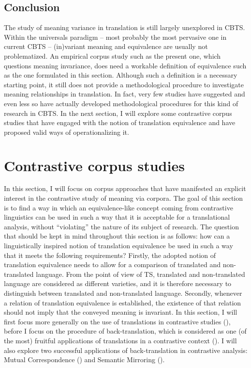 \subsection{Conclusion}
\label{sec:2.2.5}  
The study of meaning variance in translation is still largely unexplored in CBTS. Within the universals paradigm – most probably the most pervasive one in current CBTS – (in)variant meaning and equivalence are usually not problematized. An empirical corpus study such as the present one, which questions meaning invariance, does need a workable definition of equivalence such as the one formulated in this section. Although such a definition is a necessary starting point, it still does not provide a methodological procedure to investigate meaning relationships in translation. In fact, very few studies have suggested and even less so have actually developed methodological procedures for this kind of research in CBTS. In the next section, I will explore some contrastive corpus studies that have engaged with the notion of translation equivalence and have proposed valid ways of operationalizing it.

\section{Contrastive corpus studies}
\label{sec:2.3}  
In this section, I will focus on corpus approaches that have manifested an explicit interest in the contrastive study of meaning via corpora. The goal of this section is to find a way in which an equivalence-like concept coming from contrastive linguistics can be used in such a way that it is acceptable for a translational analysis, without ``violating'' the nature of its subject of research. The question that should be kept in mind throughout this section is as follows: how can a linguistically inspired notion of translation equivalence be used in such a way that it meets the following requirements? Firstly, the adopted notion of translation equivalence needs to allow for a comparison of translated and non-translated language. From the point of view of TS, translated and non-translated language are considered as different varieties, and it is therefore necessary to distinguish between translated and non-translated language. Secondly, whenever a relation of translation equivalence is established, the existence of that relation should not imply that the conveyed meaning is invariant. In this section, I will first focus more generally on the use of translations in contrastive studies (), before I focus on the procedure of back-translation, which is considered as one (of the most) fruitful applications of translations in a contrastive context (). I will also explore two successful applications of back-translation in contrastive analysis: Mutual Correspondence () and Semantic Mirroring ().

